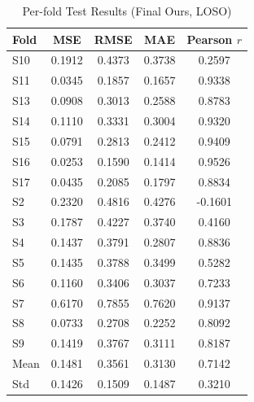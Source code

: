 \documentclass{article}
\begin{document}
\begin{table}[htbp]
\centering
\caption{Per-fold Test Results (Final Ours, LOSO)}
\label{tab:per_fold}
\small %
\begin{tabular}{lcccc}
\toprule
\textbf{Fold} & \textbf{MSE} & \textbf{RMSE} & \textbf{MAE} & \textbf{Pearson $r$} \\
\midrule
S10 & 0.1912 & 0.4373 & 0.3738 & 0.2597 \\
S11 & 0.0345 & 0.1857 & 0.1657 & 0.9338 \\
S13 & 0.0908 & 0.3013 & 0.2588 & 0.8783 \\
S14 & 0.1110 & 0.3331 & 0.3004 & 0.9320 \\
S15 & 0.0791 & 0.2813 & 0.2412 & 0.9409 \\
S16 & 0.0253 & 0.1590 & 0.1414 & 0.9526 \\
S17 & 0.0435 & 0.2085 & 0.1797 & 0.8834 \\
S2  & 0.2320 & 0.4816 & 0.4276 & -0.1601 \\
S3  & 0.1787 & 0.4227 & 0.3740 & 0.4160 \\
S4  & 0.1437 & 0.3791 & 0.2807 & 0.8836 \\
S5  & 0.1435 & 0.3788 & 0.3499 & 0.5282 \\
S6  & 0.1160 & 0.3406 & 0.3037 & 0.7233 \\
S7  & 0.6170 & 0.7855 & 0.7620 & 0.9137 \\
S8  & 0.0733 & 0.2708 & 0.2252 & 0.8092 \\
S9  & 0.1419 & 0.3767 & 0.3111 & 0.8187 \\
\midrule
Mean & 0.1481 & 0.3561 & 0.3130 & 0.7142 \\
Std  & 0.1426 & 0.1509 & 0.1487 & 0.3210 \\
\bottomrule
\end{tabular}
\end{table}
\end{document}
